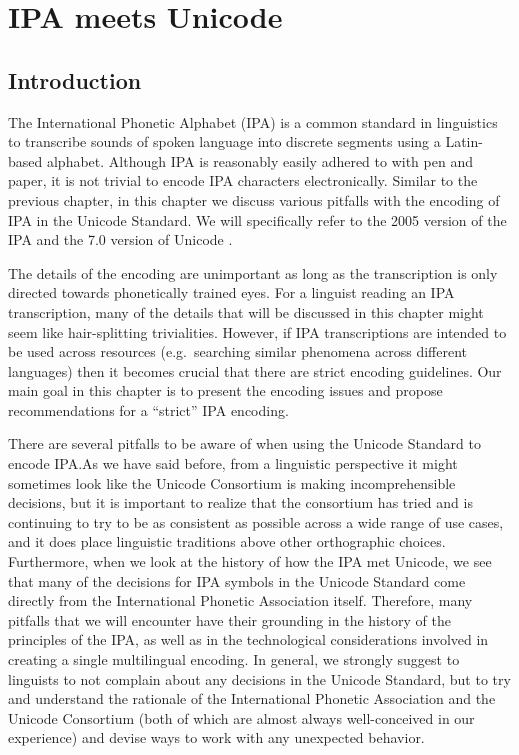 \chapter{IPA meets Unicode}
\label{ipa-meets-unicode}

\section{Introduction}

The International Phonetic Alphabet (IPA) is a common standard in linguistics to
transcribe sounds of spoken language into discrete segments using a Latin-based
alphabet. Although IPA is reasonably easily adhered to with pen and paper, it is
not trivial to encode IPA characters electronically. Similar to the previous
chapter, in this chapter we discuss various pitfalls with the encoding of IPA in
the Unicode Standard. We will specifically refer to the 2005 version of the
IPA \citep{IPA2005} and the 7.0 version of Unicode \citep{Unicode2014}.

The details of the encoding are unimportant as long as the
transcription is only directed towards phonetically trained eyes. For a linguist
reading an IPA transcription, many of the details that will be discussed in this
chapter might seem like hair-splitting trivialities. However, if IPA
transcriptions are intended to be used across resources (e.g.~searching similar
phenomena across different languages) then it becomes crucial that there are strict
encoding guidelines. Our main goal in this chapter is to present the encoding
issues and propose recommendations for a ``strict'' IPA encoding.

There are several pitfalls to be aware of when using the Unicode Standard to
encode IPA.\@ As we have said before, from a linguistic perspective it might
sometimes look like the Unicode Consortium is making incomprehensible decisions,
but it is important to realize that the consortium has tried and is continuing
to try to be as consistent as possible across a wide range of use cases, and it
does place linguistic traditions above other orthographic choices. Furthermore,
when we look at the history of how the IPA met Unicode, we see that many of the
decisions for IPA symbols in the Unicode Standard come directly from the
International Phonetic Association itself. Therefore, many pitfalls that we will
encounter have their grounding in the history of the principles of the IPA, as
well as in the technological considerations involved in creating a single
multilingual encoding. In general, we strongly suggest to linguists to not
complain about any decisions in the Unicode Standard, but to try and understand
the rationale of the International Phonetic Association and the Unicode
Consortium (both of which are almost always well-conceived in our experience)
and devise ways to work with any unexpected behavior.

